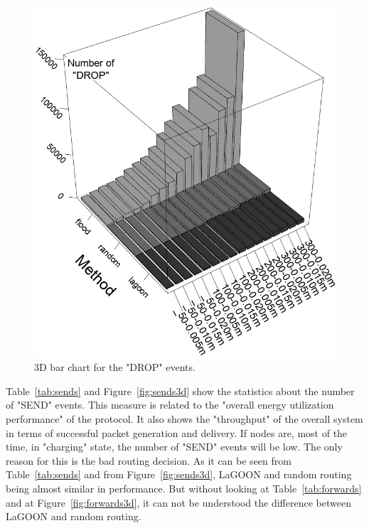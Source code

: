 \documentclass[12pt, oneandhalf, chaparabic, sees, ms]{metu}
\begin{document}
\begin{minipage}[t]{0.57\textwidth}
\begin{figure}[H]
\begin{center}
  \includegraphics[width=\textwidth]{3ddrops2.png}
   \end{center}
  \caption{3D bar chart for the "DROP" events.}
 \label{fig:drops3d}
\end{figure}
\end{minipage}



Table~\ref{tab:sends} and Figure~\ref{fig:sends3d} show the statistics about the number of "SEND" events. This measure is related to the "overall energy utilization performance" of 
the protocol. It also shows the "throughput" of the overall system in terms of successful packet generation and delivery. 
If nodes are, most of the time, in "charging" state, the number of "SEND" events will be low. 
The only reason for this is the bad routing decision. 
As it can be seen from Table~\ref{tab:sends} and from Figure~\ref{fig:sends3d}, LaGOON and random routing being almost similar in performance. 
But without looking at Table~\ref{tab:forwards} and at Figure~\ref{fig:forwards3d}, it can not be understood the difference between LaGOON and random routing. 
%
%
%
\end{document}

